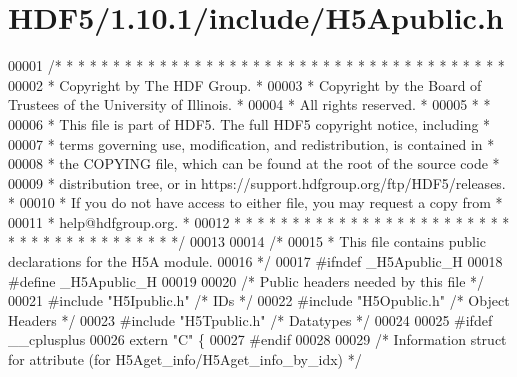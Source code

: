 \hypertarget{_h_d_f5_21_810_81_2include_2_h5_apublic_8h_source}{}\section{H\+D\+F5/1.10.1/include/\+H5\+Apublic.h}
\label{_h_d_f5_21_810_81_2include_2_h5_apublic_8h_source}

\begin{DoxyCode}
00001 \textcolor{comment}{/* * * * * * * * * * * * * * * * * * * * * * * * * * * * * * * * * * * * * * *}
00002 \textcolor{comment}{ * Copyright by The HDF Group.                                               *}
00003 \textcolor{comment}{ * Copyright by the Board of Trustees of the University of Illinois.         *}
00004 \textcolor{comment}{ * All rights reserved.                                                      *}
00005 \textcolor{comment}{ *                                                                           *}
00006 \textcolor{comment}{ * This file is part of HDF5.  The full HDF5 copyright notice, including     *}
00007 \textcolor{comment}{ * terms governing use, modification, and redistribution, is contained in    *}
00008 \textcolor{comment}{ * the COPYING file, which can be found at the root of the source code       *}
00009 \textcolor{comment}{ * distribution tree, or in https://support.hdfgroup.org/ftp/HDF5/releases.  *}
00010 \textcolor{comment}{ * If you do not have access to either file, you may request a copy from     *}
00011 \textcolor{comment}{ * help@hdfgroup.org.                                                        *}
00012 \textcolor{comment}{ * * * * * * * * * * * * * * * * * * * * * * * * * * * * * * * * * * * * * * */}
00013 
00014 \textcolor{comment}{/*}
00015 \textcolor{comment}{ * This file contains public declarations for the H5A module.}
00016 \textcolor{comment}{ */}
00017 \textcolor{preprocessor}{#ifndef \_H5Apublic\_H}
00018 \textcolor{preprocessor}{#define \_H5Apublic\_H}
00019 
00020 \textcolor{comment}{/* Public headers needed by this file */}
00021 \textcolor{preprocessor}{#include "H5Ipublic.h"}      \textcolor{comment}{/* IDs                  */}
00022 \textcolor{preprocessor}{#include "H5Opublic.h"}      \textcolor{comment}{/* Object Headers           */}
00023 \textcolor{preprocessor}{#include "H5Tpublic.h"}      \textcolor{comment}{/* Datatypes                */}
00024 
00025 \textcolor{preprocessor}{#ifdef \_\_cplusplus}
00026 \textcolor{keyword}{extern} \textcolor{stringliteral}{"C"} \{
00027 \textcolor{preprocessor}{#endif}
00028 
00029 \textcolor{comment}{/* Information struct for attribute (for H5Aget\_info/H5Aget\_info\_by\_idx) */}

\end{DoxyCode}
